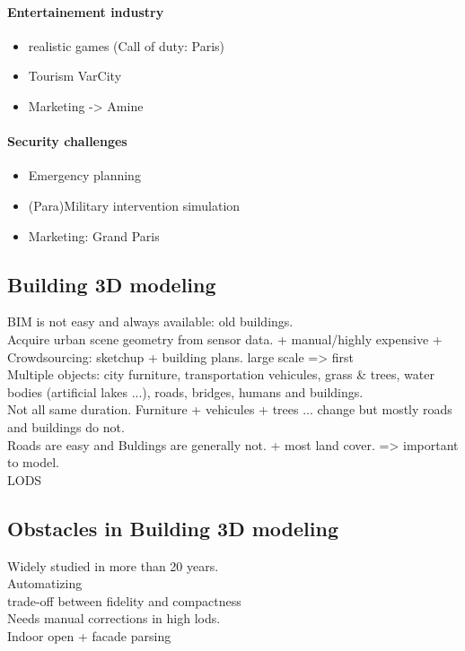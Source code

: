         \paragraph{Entertainement industry}
        \begin{itemize}
            \item realistic games (Call of duty: Paris)
            \item Tourism VarCity
            \item Marketing -> Amine
        \end{itemize}
        \paragraph{Security challenges}
        \begin{itemize}
            \item Emergency planning
            \item (Para)Military intervention simulation
            \item Marketing: Grand Paris
        \end{itemize}
    \subsection{Building 3D modeling}
        BIM is not easy and always available: old buildings.\\
        Acquire urban scene geometry from sensor data. + manual/highly expensive + Crowdsourcing: sketchup + building plans. large scale => first\\
        Multiple objects: city furniture, transportation vehicules, grass \& trees, water bodies (artificial lakes ...), roads, bridges, humans and buildings.\\
        Not all same duration. Furniture + vehicules + trees ... change but mostly roads and buildings do not.\\
        Roads are easy and Buldings are generally not. + most land cover. => important to model.\\
        LODS\\
    \subsection{Obstacles in Building 3D modeling}
        Widely studied in more than 20 years.\\
        Automatizing\\
        trade-off between fidelity and compactness\\
        Needs manual corrections in high lods.\\
        Indoor open + facade parsing\\
